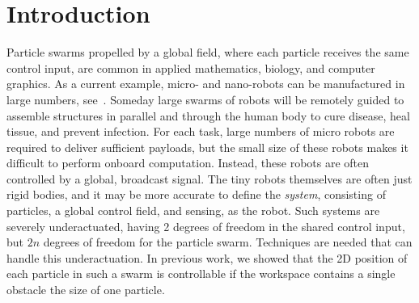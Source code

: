 \section{Introduction}\label{sec:Intro}
Particle swarms propelled by a global field, where each particle  receives the same control input, are common in applied mathematics, biology, and computer graphics. 
As a current example, micro- and nano-robots can be manufactured in large numbers, see~\cite{Chowdhury2015,martel2014computer,kim2015imparting,Donald2013,Ghosh2009,Ou2013,qiu2015magnetic}.
Someday large swarms of robots will be remotely guided
to assemble structures in parallel and 
 through the human body to cure disease, heal tissue, and prevent infection. %
 For each task, large numbers of micro robots are required to deliver sufficient payloads, but the small size of these robots makes it difficult to perform onboard computation.  Instead, these robots are often controlled by a global, broadcast signal. 
 The tiny robots themselves are often just rigid bodies, and it may be more accurate to define the \emph{system}, consisting of particles, a global control field, and sensing, as the robot.
Such systems are severely underactuated, having 2 degrees of freedom in the shared control input, but $2n$ degrees of freedom for the particle swarm.
 Techniques are needed that can handle this underactuation. 
 In previous work, we showed that the 2D position of each particle in such a swarm is controllable if the workspace contains a single obstacle the size of one particle.



